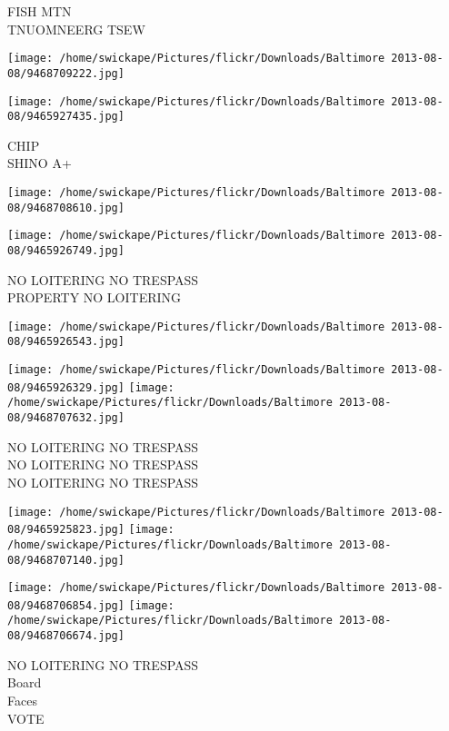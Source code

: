 \documentclass[10pt,letterpaper]{article}
\begin{document}
FISH MTN\\
TNUOMNEERG TSEW\\
\pagebreak

\texttt{[image: /home/swickape/Pictures/flickr/Downloads/Baltimore 2013-08-08/9468709222.jpg]}

\vspace{0.25in}
\texttt{[image: /home/swickape/Pictures/flickr/Downloads/Baltimore 2013-08-08/9465927435.jpg]}

CHIP\\
SHINO A+\\
\pagebreak

\texttt{[image: /home/swickape/Pictures/flickr/Downloads/Baltimore 2013-08-08/9468708610.jpg]}

\vspace{0.25in}
\texttt{[image: /home/swickape/Pictures/flickr/Downloads/Baltimore 2013-08-08/9465926749.jpg]}

NO LOITERING NO TRESPASS\\
PROPERTY NO LOITERING\\
\pagebreak

\texttt{[image: /home/swickape/Pictures/flickr/Downloads/Baltimore 2013-08-08/9465926543.jpg]}

\vspace{0.25in}
\texttt{[image: /home/swickape/Pictures/flickr/Downloads/Baltimore 2013-08-08/9465926329.jpg]}
\texttt{[image: /home/swickape/Pictures/flickr/Downloads/Baltimore 2013-08-08/9468707632.jpg]}

NO LOITERING NO TRESPASS\\
NO LOITERING NO TRESPASS\\
NO LOITERING NO TRESPASS\\
\pagebreak

\texttt{[image: /home/swickape/Pictures/flickr/Downloads/Baltimore 2013-08-08/9465925823.jpg]}
\texttt{[image: /home/swickape/Pictures/flickr/Downloads/Baltimore 2013-08-08/9468707140.jpg]}

\texttt{[image: /home/swickape/Pictures/flickr/Downloads/Baltimore 2013-08-08/9468706854.jpg]}
\texttt{[image: /home/swickape/Pictures/flickr/Downloads/Baltimore 2013-08-08/9468706674.jpg]}

NO LOITERING NO TRESPASS\\
Board\\
Faces\\
VOTE\\
\pagebreak
\end{document}
